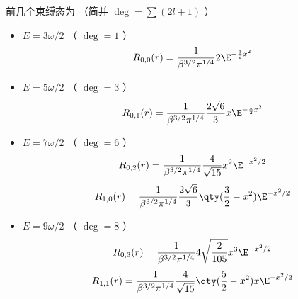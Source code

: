 前几个束缚态为 （简并 $\deg  = \sum (2l + 1)$ ）
\begin{itemize}
\item $E = 3 \omega /2$ （ $\deg  = 1$ ）
\begin{equation}
R_{0,0}(r) = \frac{1}{\beta^{3/2} \pi^{1/4}} 2\E^{-\frac12 x^2}
\end{equation}

\item $E = 5 \omega /2$ （ $\deg  = 3$ ）
\begin{equation}
R_{0,1}(r) = \frac{1}{\beta^{3/2} \pi^{1/4}} \frac{2\sqrt 6}{3} x \E^{-\frac12 x^2}
\end{equation}

\item $E = 7 \omega /2$ （ $\deg  = 6$ ）
\begin{equation}
R_{0,2}(r) = \frac{1}{\beta^{3/2} \pi^{1/4}} \frac{4}{\sqrt{15}} x^2 \E^{- x^2/2}
\end{equation}
\begin{equation}
R_{1,0}(r) = \frac{1}{\beta^{3/2} \pi^{1/4}} \frac{2\sqrt 6}{3} \qty(\frac32 - x^2) \E^{-x^2/2}
\end{equation}

\item $E = 9 \omega /2$ （ $\deg  = 8$ ）
\begin{equation}
R_{0,3}(r) = \frac{1}{\beta^{3/2} \pi^{1/4}} 4\sqrt{\frac{2}{105}} x^3 \E^{-x^2/2}
\end{equation}
\begin{equation}
R_{1,1}(r) = \frac{1}{\beta^{3/2} \pi^{1/4}} \frac{4}{\sqrt{15}} \qty(\frac52 - x^2) x \E^{-x^2/2}
\end{equation}
\end{itemize}
